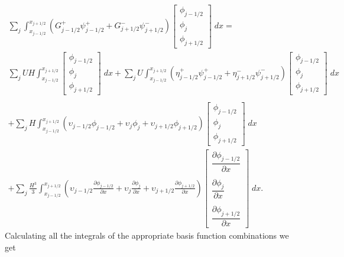 \begin{multline*}
\sum_j \int_{x_{j-1/2}}^{x_{j + 1/2}} \left(G^+_{j-1/2}\psi^+_{j - 1/2} + G^-_{j+1/2}\psi^-_{j + 1/2}\right) \begin{bmatrix}
\phi_{j-1/2}\\\phi_j \\\phi_{j+1/2}
\end{bmatrix}  \; dx= \\ \sum_j UH\int_{x_{j-1/2}}^{x_{j + 1/2}}  \begin{bmatrix}
\phi_{j-1/2}\\\phi_j \\\phi_{j+1/2}
\end{bmatrix}  \; dx + \sum_j U\int_{x_{j-1/2}}^{x_{j + 1/2}} \left(\eta^+_{j-1/2}\psi^+_{j - 1/2} + \eta^-_{j+1/2}\psi^-_{j + 1/2}\right) \begin{bmatrix}
\phi_{j-1/2}\\\phi_j \\\phi_{j+1/2}
\end{bmatrix}  \; dx \\ \\   +\sum_j H\int_{x_{j-1/2}}^{x_{j + 1/2}} \left(\upsilon_{j-1/2}\phi_{j - 1/2} + \upsilon_{j}\phi_{j}+ \upsilon_{j+1/2}\phi_{j + 1/2}\right) \begin{bmatrix}
\phi_{j-1/2}\\\phi_j \\\phi_{j+1/2}
\end{bmatrix}  \; dx \\ + 
\sum_j \frac{H^3}{3}\int_{x_{j-1/2}}^{x_{j + 1/2}} \left(\upsilon_{j-1/2} \frac{\partial \phi_{j - 1/2} }{\partial x} + \upsilon_{j}\frac{\partial \phi_{j} }{\partial x}+ \upsilon_{j+1/2}\frac{\partial \phi_{j + 1/2} }{\partial x}\right) \begin{bmatrix}
\dfrac{\partial \phi_{j - 1/2} }{\partial x}\\ \\\dfrac{\partial \phi_{j} }{\partial x}\\ \\\dfrac{\partial \phi_{j + 1/2} }{\partial x}   \end{bmatrix} \; dx.
\end{multline*}
Calculating all the integrals of the appropriate basis function combinations we get 
